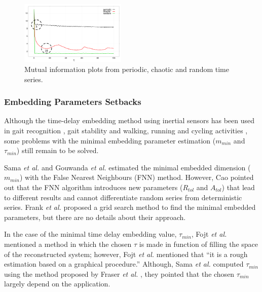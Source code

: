 \documentclass[10pt,journal,compsoc]{IEEEtran}
\begin{document}
\begin{figure}[!htb]
\centering    
 \includegraphics[width=0.45\textwidth]{mi_values_v02}
\caption[PA]{Mutual information plots from periodic, chaotic and random time series.}
\label{fig:mi}
\end{figure}

\subsubsection{Embedding Parameters Setbacks}
Although the time-delay embedding method using inertial 
sensors has been used in gait recognition \cite{Sama2013}, gait stability 
\cite{Gouwanda2012} and walking, running and cycling activities \cite{Frank2010},
some problems with the minimal embedding parameter estimation  
($m_{min}$ and $\tau_{min}$) still remain to be solved.

Sama \textit{et al.} \cite{Sama2013} and Gouwanda \textit{et al.} \cite{Gouwanda2012} estimated 
the minimal embedded dimension ($m_{min}$) with the False Nearest 
Neighbours (FNN) method. However, Cao \cite{Cao1997} pointed 
out that the FNN algorithm introduces new parameters 
($R_{tol}$ and $A_{tol}$) that lead to different results and cannot 
differentiate random series from deterministic series. Frank 
\textit{et al.} \cite{Frank2010} proposed a grid search method to find the minimal 
embedded parameters, but there are no details about their 
approach.

In the case of the minimal time delay embedding value, 
$\tau_{min}$, Fojt \textit{et al.} \cite{Fojt1998} mentioned a method in which the 
chosen $\tau$ is made in function of filling the space of the 
reconstructed system; however, Fojt \textit{et al.} \cite{Fojt1998} mentioned that 
``it is a rough estimation based on a graphical procedure.''
Although, Sama \textit{et al.} \cite{Sama2013} computed $\tau_{min}$ using the method 
proposed by Fraser \textit{et al.} \cite{Fraser1986}, they pointed that the chosen 
$\tau_{min}$ largely depend on the application.
\end{document}

